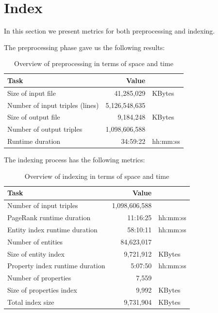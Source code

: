 
\section{Index}

In this section we present metrics for both preprocessing and indexing.

The preprocessing phase gave us the following results:

\begin{table}[h!]
\centering
\begin{tabular}{lrl}
Task                                    & Value  &                    \\
\hline
Size of input file                      & 41,285,029 & KBytes       \\
Number of input triples (lines)         & 5,126,548,635  &            \\
Size of output file                     & 9,184,248 & KBytes        \\
Number of output triples                & 1,098,606,588 &             \\
Runtime duration                        & 34:59:22  & hh:mm:ss        \\
\end{tabular}
\caption{Overview of preprocessing in terms of space and time}
\label{table:preprocessingMetrics}
\end{table}

The indexing process has the following metrics:

\begin{table}[h!]
\centering
\begin{tabular}{lrl}
Task                                    & Value  &                    \\
\hline
Number of input triples                 & 1,098,606,588 &             \\
PageRank runtime duration               & 11:16:25 & hh:mm:ss        \\
Entity index runtime duration           & 58:10:11 & hh:mm:ss       \\
Number of entities                      & 84,623,017 &                \\
Size of entity index                    & 9,721,912 & KBytes         \\
Property index runtime duration         & 5:07:50 & hh:mm:ss       \\
Number of properties                    & 7,559 &                     \\
Size of properties index                & 9,992 & KBytes             \\
Total index size                        & 9,731,904 & KBytes         \\
\end{tabular}
\caption{Overview of indexing in terms of space and time}
\label{table:indexMetrics}
\end{table}

